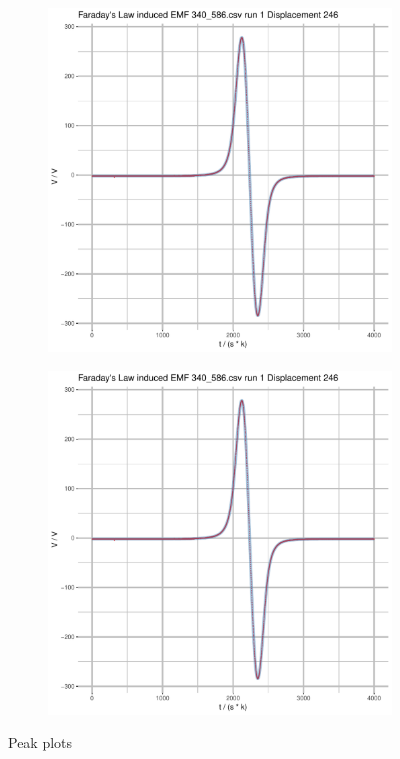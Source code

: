 \documentclass[a4paper,11pt]{article}
\begin{document}
\begin{figure}[b]
\centering
\begin{subfigure}{.7\textwidth}
    \centering
    \includegraphics[width=\textwidth,page=22]{Rplots.pdf}
\end{subfigure}
\begin{subfigure}{.7\textwidth}
    \centering
    \includegraphics[width=\textwidth,page=23]{Rplots.pdf}
\end{subfigure}
\caption{Peak plots}\label{fig_peak}
\end{figure}
\end{document}

